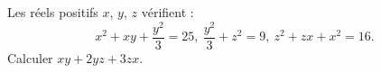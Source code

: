 Les réels positifs $x$, $y$, $z$ vérifient :
\[
x^2 + xy + \frac{y^2}{3} = 25,\ \frac{y^2}{3} + z^2 = 9,\ z^2 + zx + x^2 = 16.
\]
Calculer $xy + 2yz + 3zx$.
